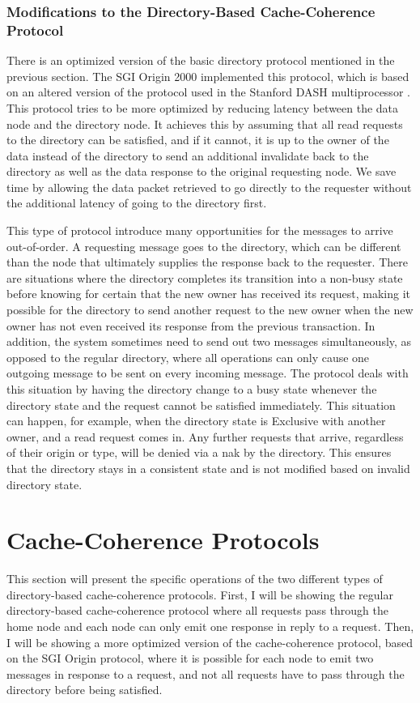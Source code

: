 \documentclass[letterpaper]{article}
\begin{document}
\subsubsection{Modifications to the Directory-Based Cache-Coherence Protocol}
There is an optimized version of the basic directory protocol mentioned in the previous section. The SGI Origin 2000 implemented this protocol, which is based on an altered version of the protocol used in the Stanford DASH multiprocessor \cite{LAU00}. This protocol tries to be more optimized by reducing latency between the data node and the directory node. It achieves this by assuming that all read requests to the directory can be satisfied, and if it cannot, it is up to the owner of the data instead of the directory to send an additional invalidate back to the directory as well as the data response to the original requesting node. We save time by allowing the data packet retrieved to go directly to the requester without the additional latency of going to the directory first.

This type of protocol introduce many opportunities for the messages to arrive out-of-order. A requesting message goes to the directory, which can be different than the node that ultimately supplies the response back to the requester. There are situations where the directory completes its transition into a non-busy state before knowing for certain that the new owner has received its request, making it possible for the directory to send another request to the new owner when the new owner has not even received its response from the previous transaction. In addition, the system sometimes need to send out two messages simultaneously, as opposed to the regular directory, where all operations can only cause one outgoing message to be sent on every incoming message. The protocol deals with this situation by having the directory change to a busy state whenever the directory state and the request cannot be satisfied immediately. This situation can happen, for example, when the directory state is Exclusive with another owner, and a read request comes in. Any further requests that arrive, regardless of their origin or type, will be denied via a nak by the directory. This ensures that the directory stays in a consistent state and is not modified based on invalid directory state.

\section{Cache-Coherence Protocols}
This section will present the specific operations of the two different types of directory-based cache-coherence protocols. First, I will be showing the regular directory-based cache-coherence protocol where all requests pass through the home node and each node can only emit one response in reply to a request. Then, I will be showing a more optimized version of the cache-coherence protocol, based on the SGI Origin protocol, where it is possible for each node to emit two messages in response to a request, and not all requests have to pass through the directory before being satisfied.
\end{document}
